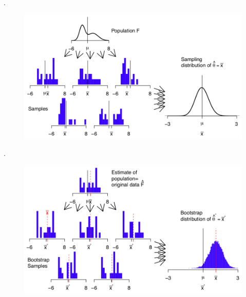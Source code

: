 \documentclass[aspectratio=169]{../latex_main/tntbeamer}  %
\begin{document}
	
	\begin{frame}{.}
	    \begin{figure}
	        \centering
	        \includegraphics[scale=.45]{Bild6}
	    \end{figure}
	\end{frame}
	
	
	\begin{frame}{.}
	    \begin{figure}
	        \centering
	        \includegraphics[scale=.45]{Bild7}
	    \end{figure}
	\end{frame}
\end{document}
